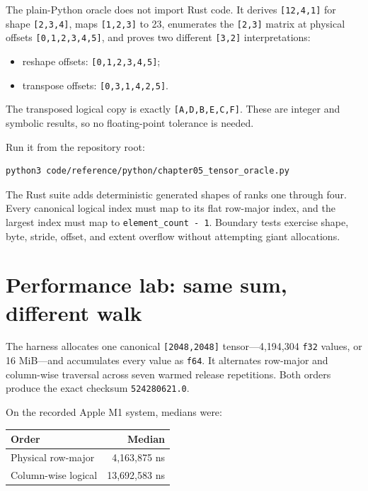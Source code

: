 The plain-Python oracle does not import Rust code. It derives
\texttt{{[}12,4,1{]}} for shape \texttt{{[}2,3,4{]}}, maps
\texttt{{[}1,2,3{]}} to 23, enumerates the \texttt{{[}2,3{]}} matrix at
physical offsets \texttt{{[}0,1,2,3,4,5{]}}, and proves two different
\texttt{{[}3,2{]}} interpretations:

\begin{itemize}
\tightlist
\item
  reshape offsets: \texttt{{[}0,1,2,3,4,5{]}};
\item
  transpose offsets: \texttt{{[}0,3,1,4,2,5{]}}.
\end{itemize}

The transposed logical copy is exactly \texttt{{[}A,D,B,E,C,F{]}}. These
are integer and symbolic results, so no floating-point tolerance is
needed.

Run it from the repository root:

\begin{verbatim}
python3 code/reference/python/chapter05_tensor_oracle.py
\end{verbatim}

The Rust suite adds deterministic generated shapes of ranks one through
four. Every canonical logical index must map to its flat row-major
index, and the largest index must map to \texttt{element\_count\ -\ 1}.
Boundary tests exercise shape, byte, stride, offset, and extent overflow
without attempting giant allocations.

\section{Performance lab: same sum, different
walk}\label{performance-lab-same-sum-different-walk}

The  harness allocates one canonical \texttt{{[}2048,2048{]}}
tensor---4,194,304 \texttt{f32} values, or 16 MiB---and accumulates
every value as \texttt{f64}. It alternates row-major and column-wise
traversal across seven warmed release repetitions. Both orders produce
the exact checksum \texttt{524280621.0}.

On the recorded Apple M1 system, medians were:

{\def\LTcaptype{none} %
\begin{longtable}[]{@{}lr@{}}
\toprule\noalign{}
Order & Median \\
\midrule\noalign{}
\endhead
\bottomrule\noalign{}
\endlastfoot
Physical row-major & 4,163,875 ns \\
Column-wise logical & 13,692,583 ns \\
\end{longtable}
}

